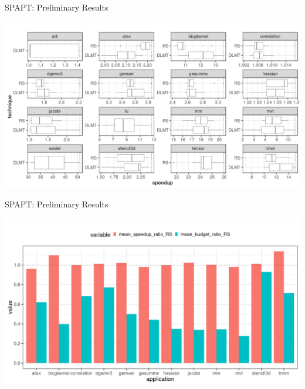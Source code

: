 \documentclass[10pt, compress, aspectratio=169, xcolor={table,usenames,dvipsnames}]{beamer}
\begin{document}
\begin{frame}[label={sec:orgb3d10a0}]{SPAPT: Preliminary Results}
\begin{center}
\begin{center}
\includegraphics[width=.86\linewidth]{../../img/preliminary_spapt.png}
\end{center}
\end{center}
\end{frame}
\begin{frame}[label={sec:orgf97d0db}]{SPAPT: Preliminary Results}
\begin{center}
\begin{center}
\includegraphics[width=.89\linewidth]{../../img/preliminary_spapt_ratios.png}
\end{center}
\end{center}
\end{frame}
\end{document}
